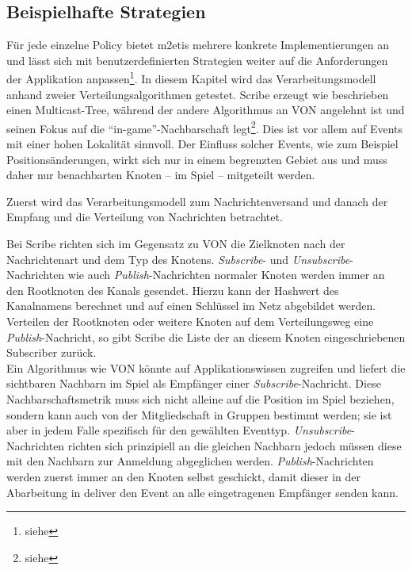\subsection*{Beispielhafte Strategien}
Für jede einzelne Policy bietet \ac{m2etis} mehrere konkrete Implementierungen an und lässt sich mit benutzerdefinierten Strategien weiter auf die Anforderungen der Applikation anpassen\footnote{siehe }. In diesem Kapitel wird das Verarbeitungsmodell anhand zweier Verteilungsalgorithmen getestet. Scribe \cite{Castro2002Scribe} erzeugt wie beschrieben einen Multicast-Tree, während der andere Algorithmus an VON \cite{Hu2006VON} angelehnt ist und seinen Fokus auf die \enquote{in-game}-Nachbarschaft legt\footnote{siehe }. Dies ist vor allem auf Events mit einer hohen Lokalität sinnvoll. Der Einfluss solcher Events, wie zum Beispiel Positionsänderungen, wirkt sich nur in einem begrenzten Gebiet aus und muss daher nur benachbarten Knoten -- im Spiel -- mitgeteilt werden.

Zuerst wird das Verarbeitungsmodell zum Nachrichtenversand und danach der Empfang und die Verteilung von Nachrichten betrachtet.

Bei Scribe richten sich im Gegensatz zu VON die Zielknoten nach der Nachrichtenart und dem Typ des Knotens. \emph{Subscribe}- und \emph{Unsubscribe}-Nachrichten wie auch \emph{Publish}-Nachrichten normaler Knoten werden immer an den Rootknoten des Kanals gesendet. Hierzu kann der Hashwert des Kanalnamens berechnet und auf einen Schlüssel im Netz abgebildet werden. Verteilen der Rootknoten oder weitere Knoten auf dem Verteilungsweg eine \emph{Publish}-Nachricht, so gibt Scribe die Liste der an diesem Knoten eingeschriebenen Subscriber zurück.\\
Ein Algorithmus wie VON könnte auf Applikationswissen zugreifen und liefert die sichtbaren Nachbarn im Spiel als Empfänger einer \emph{Subscribe}-Nachricht. Diese Nachbarschaftsmetrik muss sich nicht alleine auf die Position im Spiel beziehen, sondern kann auch von der Mitgliedschaft in Gruppen bestimmt werden; sie ist aber in jedem Falle spezifisch für den gewählten Eventtyp. \emph{Unsubscribe}-Nachrichten richten sich prinzipiell an die gleichen Nachbarn jedoch müssen diese mit den Nachbarn zur Anmeldung abgeglichen werden. \emph{Publish}-Nachrichten werden zuerst immer an den Knoten selbst geschickt, damit dieser in der Abarbeitung in deliver den Event an alle eingetragenen Empfänger senden kann.


